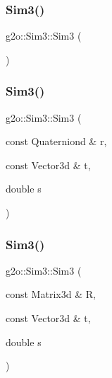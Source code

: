 \subsubsection{\texorpdfstring{Sim3()}{Sim3()}\hspace{0.1cm}{\footnotesize\ttfamily [1/4]}}
{\footnotesize\ttfamily g2o\+::\+Sim3\+::\+Sim3 (\begin{DoxyParamCaption}{ }\end{DoxyParamCaption})\hspace{0.3cm}{\ttfamily [inline]}}

\mbox{\label{structg2o_1_1_sim3_a3f7bc6953078a87865575192221def7e}} 
\subsubsection{\texorpdfstring{Sim3()}{Sim3()}\hspace{0.1cm}{\footnotesize\ttfamily [2/4]}}
{\footnotesize\ttfamily g2o\+::\+Sim3\+::\+Sim3 (\begin{DoxyParamCaption}\item[{const Quaterniond \&}]{r,  }\item[{const Vector3d \&}]{t,  }\item[{double}]{s }\end{DoxyParamCaption})\hspace{0.3cm}{\ttfamily [inline]}}

\mbox{\label{structg2o_1_1_sim3_a8163b7b417a91a758b10593929bae6c5}} 
\subsubsection{\texorpdfstring{Sim3()}{Sim3()}\hspace{0.1cm}{\footnotesize\ttfamily [3/4]}}
{\footnotesize\ttfamily g2o\+::\+Sim3\+::\+Sim3 (\begin{DoxyParamCaption}\item[{const Matrix3d \&}]{R,  }\item[{const Vector3d \&}]{t,  }\item[{double}]{s }\end{DoxyParamCaption})\hspace{0.3cm}{\ttfamily [inline]}}


